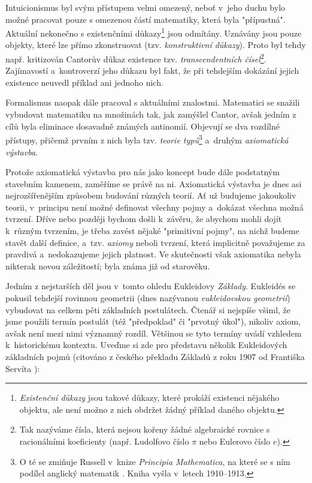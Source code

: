 Intuicionismus byl svým přístupem velmi omezený, neboť v~jeho duchu bylo možné pracovat pouze s omezenou částí matematiky, která byla "přípustná". Aktuální nekonečno s existenčními důkazy\footnote{\emph{Existenční důkazy} jsou takové důkazy, které prokáží existenci nějakého objektu, ale není možno z nich obdržet žádný příklad daného objektu.} jsou odmítány. Uznávány jsou pouze objekty, které lze přímo zkonstruovat (tzv. \emph{konstruktivní důkazy}). Proto byl tehdy např. kritizován Cantorův důkaz existence tzv. \emph{transcendentních čísel}\footnote{Tak nazýváme čísla, která nejsou kořeny žádné algebraické rovnice s racionálními koeficienty (např. Ludolfovo číslo $\pi$ nebo Eulerovo číslo $e$).}. Zajímavostí a~kontroverzí jeho důkazu byl fakt, že při tehdejším dokázání jejich existence neuvedl příklad ani jednoho nich.\par
Formalismus naopak dále pracoval s aktuálními znalostmi. Matematici se snažili vybudovat matematiku na množinách tak, jak zamýšlel Cantor, avšak jedním z cílů byla eliminace dosavadně známých antinomií. Objevují se dva rozdílné přístupy, přičemž prvním z nich byla tzv. \emph{teorie typů}\footnote{O té se zmiňuje Russell v~knize \emph{Principia Mathematica}, na které se s ním podílel anglický matematik . Kniha vyšla v~letech 1910--1913.} a~druhým \emph{axiomatická výstavba}.\par
Protože axiomatická výstavba pro nás jako koncept bude dále podstatným stavebním kamenem, zaměříme se právě na ni. Axiomatická výstavba je dnes asi nejrozšířenějším způsobem budování různých teorií. Ať už budujeme jakoukoliv teorii, v~principu není možné definovat všechny pojmy a~dokázat všechna možná tvrzení. Dříve nebo později bychom došli k~závěru, že abychom mohli dojít k~různým tvrzením, je třeba zavést nějaké "primitivní pojmy", na nichž budeme stavět další definice, a~tzv. \emph{axiomy} neboli tvrzení, která implicitně považujeme za pravdivá a~nedokazujeme jejich platnost. Ve skutečnosti však axiomatika nebyla nikterak novou záležitostí; byla známa již od starověku.\par
Jedním z nejstarších děl jsou v~tomto ohledu Eukleidovy \emph{Základy}. Eukleidés se pokusil tehdejší rovinnou geometrii (dnes nazývanou \emph{eukleidovskou geometrií}) vybudovat na celkem pěti základních postulátech. Čtenář si nejspíše všiml, že jsme použili termín postulát (též "předpoklad" či "prvotný úkol"), nikoliv axiom, avšak není mezi nimi významný rozdíl. Většinou se tyto termíny uvádí vzhledem k~historickému kontextu. Uveďme si zde pro představu několik Eukleidových základních pojmů (citováno z českého překladu Základů z roku 1907 od Františka Servíta \cite{Eukleides1907}):

